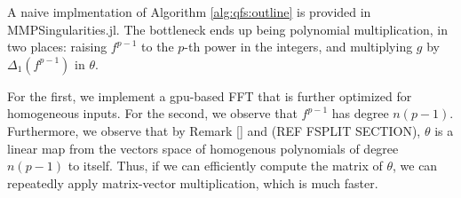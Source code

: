A naive implmentation of Algorithm \ref{alg:qfs:outline}
is provided in MMPSingularities.jl.
The bottleneck ends up being polynomial multiplication, 
in two places:
raising \(f^{p-1}\) to the \(p\)-th power in the integers,
and multiplying \(g\) by \(\Delta_{1}(f^{p-1})\) 
in \(\theta\).

For the first, we implement a gpu-based FFT that is
further optimized for homogeneous inputs.
For the second, we observe that \(f^{p-1}\) has degree
\(n(p-1)\). 
Furthermore, we observe that by Remark \ref{} and 
(REF FSPLIT SECTION), \(\theta\) is a linear map
from the vectors space of 
homogenous polynomials of degree \(n(p-1)\) 
to itself.
Thus, if we can efficiently compute the matrix of \(\theta\),
we can repeatedly apply matrix-vector multiplication,
which is much faster.


